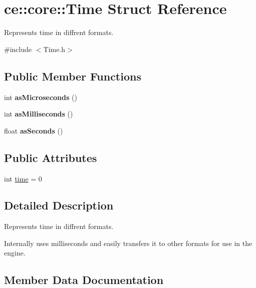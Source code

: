 \hypertarget{structce_1_1core_1_1_time}{}\section{ce\+:\+:core\+:\+:Time Struct Reference}
\label{structce_1_1core_1_1_time}


Represents time in diffrent formats.  




{\ttfamily \#include $<$Time.\+h$>$}

\subsection*{Public Member Functions}
\begin{DoxyCompactItemize}
\item 
\mbox{\label{structce_1_1core_1_1_time_aa418056d22ac6c29edfb05a5bba319ec}} 
int {\bfseries as\+Microseconds} ()
\item 
\mbox{\label{structce_1_1core_1_1_time_a7e4e98c781cc94efff0092fcf373b067}} 
int {\bfseries as\+Milliseconds} ()
\item 
\mbox{\label{structce_1_1core_1_1_time_a2d55e757931da557abf5ec8a73404f47}} 
float {\bfseries as\+Seconds} ()
\end{DoxyCompactItemize}
\subsection*{Public Attributes}
\begin{DoxyCompactItemize}
\item 
int \hyperlink{structce_1_1core_1_1_time_a9c46ccd85022eb7a5374b2a28cfc9c97}{time} = 0
\end{DoxyCompactItemize}


\subsection{Detailed Description}
Represents time in diffrent formats. 

Internally uses milliseconds and easily transfers it to other formats for use in the engine. 

\subsection{Member Data Documentation}
\mbox{\label{structce_1_1core_1_1_time_a9c46ccd85022eb7a5374b2a28cfc9c97}} 
